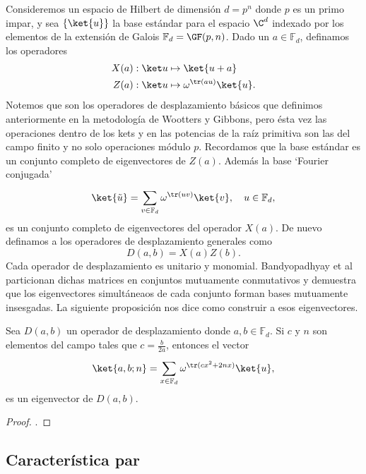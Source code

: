   Consideremos un espacio de Hilbert de dimensión $d =
  p^{n}$ donde $p$ es un primo impar, y sea $\{\ket{u}\}$ la
  base estándar para el espacio $\C^{d}$ indexado por los
  elementos de la extensión de Galois $\mathbb F_{d} =
  \GF(p,n)$. Dado un $a \in \mathbb F_d$, definamos los
  operadores
  \begin{align}
    X(a) &: \ket u \mapsto \ket{u+a} \\
    Z(a) &: \ket u \mapsto \omega^{\tr(au)} \ket{u}.
  \end{align}
  Notemos que son los operadores de desplazamiento básicos
  que definimos anteriormente en la metodología de Wootters
  y Gibbons, pero ésta vez las operaciones dentro de los
  kets y en las potencias de la raíz primitiva son las del
  campo finito y no solo operaciones módulo $p$. Recordamos
  que la base estándar es un conjunto completo de
  eigenvectores de $Z(a)$. Además la base `Fourier
  conjugada'
  \[
    \ket{\tilde u}
    = \sum_{v \in \mathbb F_d}^{} \omega^{\tr(uv)} \ket{v},
    \quad u \in \mathbb F_d,
  \] 
  es un conjunto completo de eigenvectores del operador
  $X(a)$. De nuevo definamos a los operadores de
  desplazamiento generales como
  \[
    D(a,b) = X(a)Z(b).
  \] 
  Cada operador de desplazamiento es unitario y monomial.
  Bandyopadhyay et al particionan dichas matrices en
  conjuntos mutuamente conmutativos y demuestra que los
  eigenvectores simultáneaos de cada conjunto forman bases
  mutuamente insesgadas. La siguiente proposición nos dice
  como construir a esos eigenvectores.
  \begin{proposition}
    Sea $D(a,b)$ un operador de desplazamiento donde $a,b
    \in \mathbb F_d$. Si $c$ y $n$ son elementos del campo
    tales que $c = \frac{b}{2a}$, entonces el vector
    \begin{equation}
      \ket{a,b; n}
      = \sum_{x \in \mathbb F_d}^{} \omega^{\tr(cx^2+2nx)}
      \ket{u},
    \end{equation}
    es un eigenvector de $D(a,b)$.
  \end{proposition}
  \begin{proof}
    .
  \end{proof}

  \subsection{Característica par}

